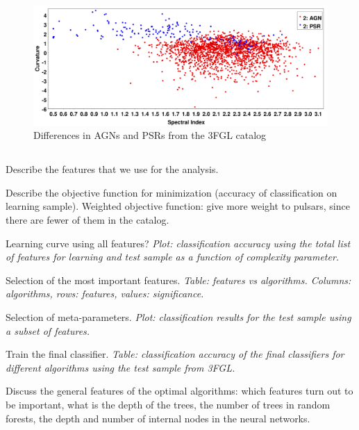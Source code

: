 \begin{figure}[h]
\includegraphics[width=\onepic\textwidth]{plots/signifcurvvsspecind2.pdf}
\caption{Differences in AGNs and PSRs from the 3FGL catalog}
\label{fig:corr}
\end{figure}


\subsection{}


\ben
\item
Describe the features that we use for the analysis.
\item
Describe the objective function for minimization (accuracy of classification on learning sample).
Weighted objective function: give more weight to pulsars, since there are fewer of them in the catalog.
\item
Learning curve using all features?
{\it Plot: classification accuracy using the total list of features for learning and test sample as a function of complexity parameter.}
\item
Selection of the most important features.
{\it Table: features vs algorithms. Columns: algorithms, rows: features, values: significance.}
\item
Selection of meta-parameters.
{\it Plot: classification results for the test sample using a subset of features.}
\item
Train the final classifier.
{\it Table: classification accuracy of the final classifiers for different algorithms using the test sample from 3FGL.}
\een

Discuss the general features of the optimal algorithms: which features turn out to be important, what is the depth of the trees, the number of trees in random forests, the depth and number of internal nodes in the neural networks. \\

